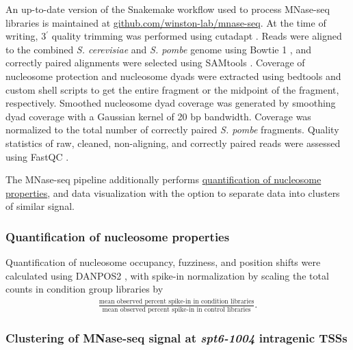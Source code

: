 An up-to-date version of the Snakemake \citep{koster2012} workflow used to process MNase-seq libraries is maintained at \href{https://github.com/winston-lab/mnase-seq}{github.com/winston-lab/mnase-seq}.
At the time of writing, 3$^\prime$ quality trimming was performed using cutadapt \citep{martin2011}.
Reads were aligned to the combined \textit{S. cerevisiae} and \textit{S. pombe} genome using Bowtie 1 \citep{langmead2009}, and correctly paired alignments were selected using SAMtools \citep{li2009}.
Coverage of nucleosome protection and nucleosome dyads were extracted using bedtools \citep{quinlan2010} and custom shell scripts to get the entire fragment or the midpoint of the fragment, respectively.
Smoothed nucleosome dyad coverage was generated by smoothing dyad coverage with a Gaussian kernel of 20 bp bandwidth.
Coverage was normalized to the total number of correctly paired \textit{S. pombe} fragments.
Quality statistics of raw, cleaned, non-aligning, and correctly paired reads were assessed using FastQC \citep{andrews2010}.

The MNase-seq pipeline additionally performs \hyperref[subsubsec:nucleosome_quantification]{quantification of nucleosome properties}, and data visualization with the option to separate data into clusters of similar signal.

\subsubsection{Quantification of nucleosome properties}
\label{subsubsec:nucleosome_quantification}
Quantification of nucleosome occupancy, fuzziness, and position shifts were calculated using DANPOS2 \citep{chen2013}, with spike-in normalization by scaling the total counts in condition group libraries by
\begin{align*}
    \frac{\text{mean observed percent spike-in in condition libraries}}{\text{mean observed percent spike-in in control libraries}}.
\end{align*}

\subsubsection[Clustering of MNase-seq signal\\ at \textit{spt6-1004} intragenic TSSs]{Clustering of MNase-seq signal at \textit{spt6-1004} intragenic TSSs}

